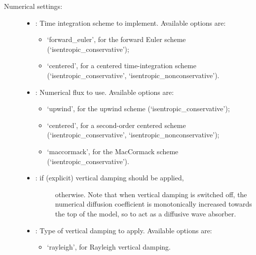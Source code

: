 \documentclass[letterpaper,10pt,english]{sphinxmanual}
\begin{document}
\begin{description}
\item[{Numerical settings:}] \leavevmode\begin{itemize}
\item {} 
: Time integration scheme to implement. Available options are:
\begin{itemize}
\item {} 
‘forward\_euler’, for the forward Euler scheme (‘isentropic\_conservative’);

\item {} 
‘centered’, for a centered time-integration scheme (‘isentropic\_conservative’, ‘isentropic\_nonconservative’).

\end{itemize}

\item {} 
: Numerical flux to use. Available options are:
\begin{itemize}
\item {} 
‘upwind’, for the upwind scheme (‘isentropic\_conservative’);

\item {} 
‘centered’, for a second-order centered scheme (‘isentropic\_conservative’, ‘isentropic\_nonconservative’);

\item {} 
‘maccormack’, for the MacCormack scheme (‘isentropic\_conservative’).

\end{itemize}

\item {} \begin{description}
\item[{:  if (explicit) vertical damping should be applied,}] \leavevmode
{} otherwise. Note that when vertical damping is switched off, the numerical diffusion               coefficient is monotonically increased towards the top of the model, so to act as a diffusive wave absorber.

\end{description}

\item {} 
: Type of vertical damping to apply. Available options are:
\begin{itemize}
\item {} 
‘rayleigh’, for Rayleigh vertical damping.

\end{itemize}


\end{itemize}
\end{description}
\end{document}
